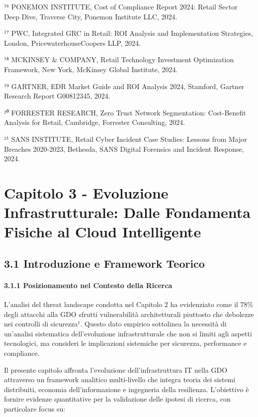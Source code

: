 \documentclass{report}
\begin{document}
¹⁶ PONEMON INSTITUTE, Cost of Compliance Report 2024: Retail Sector Deep
Dive, Traverse City, Ponemon Institute LLC, 2024.

¹⁷ PWC, Integrated GRC in Retail: ROI Analysis and Implementation
Strategies, London, PricewaterhouseCoopers LLP, 2024.

¹⁸ MCKINSEY \& COMPANY, Retail Technology Investment Optimization
Framework, New York, McKinsey Global Institute, 2024.

¹⁹ GARTNER, EDR Market Guide and ROI Analysis 2024, Stamford, Gartner
Research Report G00812345, 2024.

²⁰ FORRESTER RESEARCH, Zero Trust Network Segmentation: Cost-Benefit
Analysis for Retail, Cambridge, Forrester Consulting, 2024.

²¹ SANS INSTITUTE, Retail Cyber Incident Case Studies: Lessons from
Major Breaches 2020-2023, Bethesda, SANS Digital Forensics and Incident
Response, 2024.

\chapter{Capitolo 3 - Evoluzione Infrastrutturale: Dalle Fondamenta
Fisiche al Cloud
Intelligente}\label{capitolo-3---evoluzione-infrastrutturale-dalle-fondamenta-fisiche-al-cloud-intelligente}

\section{3.1 Introduzione e Framework
Teorico}\label{introduzione-e-framework-teorico}

\subsubsection{3.1.1 Posizionamento nel Contesto della
Ricerca}\label{posizionamento-nel-contesto-della-ricerca}

L'analisi del threat landscape condotta nel Capitolo 2 ha evidenziato
come il 78\% degli attacchi alla GDO sfrutti vulnerabilità
architetturali piuttosto che debolezze nei controlli di sicurezza¹.
Questo dato empirico sottolinea la necessità di un'analisi sistematica
dell'evoluzione infrastrutturale che non si limiti agli aspetti
tecnologici, ma consideri le implicazioni sistemiche per sicurezza,
performance e compliance.

Il presente capitolo affronta l'evoluzione dell'infrastruttura IT nella
GDO attraverso un framework analitico multi-livello che integra teoria
dei sistemi distribuiti, economia dell'informazione e ingegneria della
resilienza. L'obiettivo è fornire evidenze quantitative per la
validazione delle ipotesi di ricerca, con particolare focus su:
\end{document}
